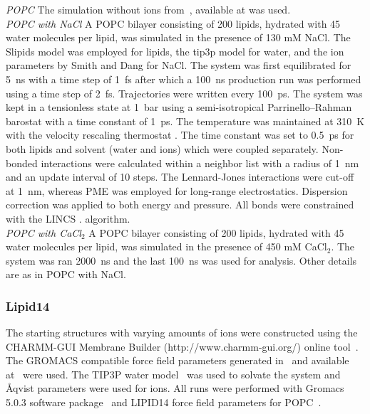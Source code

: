 \documentclass[pre,aps,floatfix,authordate1-4,twocolumn]{revtex4-1}
\begin{document}
{\it POPC} The simulation without ions from~\cite{botan15}, available at \cite{slipidsFILESpopc} was used. \\
{\it POPC with NaCl}
A POPC bilayer consisting of 200 lipids, hydrated with 45 water molecules per lipid, 
was simulated in the presence of 130 mM NaCl. 
The Slipids model \cite{jambeck12,jambeck12b}
was employed for lipids, the tip3p model \cite{jorgensen83} for water, and the ion parameters by Smith 
and Dang \cite{smith94} for NaCl. The system was first
equilibrated for 5~ns with a time step of 1~fs after which a 100~ns production run was performed using
a time step of 2~fs. Trajectories were written every 100~ps. The system was kept in a tensionless state at 1~bar 
using a semi-isotropical Parrinello--Rahman barostat \cite{parrinello81} with a time constant of 1~ps. 
The temperature was maintained at 310~K
with the velocity rescaling thermostat \cite{bussi07}. The time constant was set to 0.5~ps for both lipids and 
solvent (water and ions) which were coupled separately. Non-bonded interactions were calculated
within a neighbor list with a radius of 1~nm and an update interval of 10 steps. The Lennard-Jones
interactions were cut-off at 1~nm, whereas PME \cite{darden93,essman95} was employed for long-range electrostatics. 
Dispersion correction was applied to both energy and pressure. All bonds were constrained with the LINCS \cite{hess97,hess07}.
algorithm. \\
{\it POPC with CaCl$_2$} A POPC bilayer consisting of 200 lipids, hydrated with 45 water molecules per lipid, 
was simulated in the presence of 450 mM CaCl$_2$. The system was ran 2000~ns and the last 100~ns was used 
for analysis. Other details are as in POPC with NaCl.


\subsubsection{Lipid14}
The starting structures with varying amounts of ions were constructed using the CHARMM-GUI Membrane Builder (http://www.charmm-gui.org/) 
online tool~\cite{lee15}. The GROMACS compatible force field parameters generated in~\cite{botan15} and 
available at~\cite{lipid14files} were used. 
The TIP3P water model~\cite{jorgensen83} was used to solvate the system and \r{A}qvist \cite{aqvist90} parameters were used for ions.
All runs were performed with Gromacs 5.0.3 software package~\cite{abraham15}
and LIPID14 force field parameters for POPC~\cite{dickson14}. 
\end{document}

